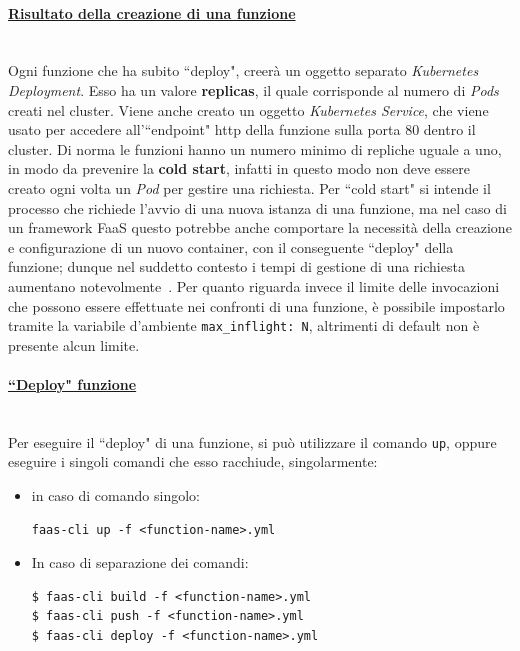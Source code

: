 \documentclass[12pt,a4paper,openany,twoside]{book}
\begin{document}
\paragraph{\underline{Risultato della creazione di una funzione}} ~\\
Ogni funzione che ha subito ``deploy", creerà un oggetto separato \textit{Kubernetes Deployment}. Esso ha un valore \textbf{replicas}, il quale corrisponde al numero di \textit{Pods} creati nel cluster. Viene anche creato un oggetto \textit{Kubernetes Service}, che viene usato per accedere all'``endpoint" \ac{http} della funzione sulla porta 80 dentro il cluster.
Di norma le funzioni hanno un numero minimo di repliche uguale a uno, in modo da prevenire la \textbf{cold start}, infatti in questo modo non deve essere creato ogni volta un \textit{Pod} per gestire una richiesta. Per ``cold start" si intende il processo che richiede l'avvio di una nuova istanza di una funzione, ma nel caso di un framework \ac{FaaS} questo potrebbe anche comportare la necessità della creazione e configurazione di un nuovo container, con il conseguente ``deploy" della funzione; dunque nel suddetto contesto i tempi di gestione di una richiesta aumentano notevolmente~\cite{216063}.
Per quanto riguarda invece il limite delle invocazioni che possono essere effettuate nei confronti di una funzione, è possibile impostarlo tramite la variabile d'ambiente \texttt{max\_inflight: N}, altrimenti di default non è presente alcun limite.

\paragraph{\underline{``Deploy" funzione}} ~\\
Per eseguire il ``deploy" di una funzione, si può utilizzare il comando \texttt{up}, oppure eseguire i singoli comandi che esso racchiude, singolarmente:
\begin{itemize}
    \item in caso di comando singolo: \begin{lstlisting}
faas-cli up -f <function-name>.yml\end{lstlisting}
    \item In caso di separazione dei comandi: \begin{lstlisting}
$ faas-cli build -f <function-name>.yml
$ faas-cli push -f <function-name>.yml
$ faas-cli deploy -f <function-name>.yml\end{lstlisting}
\end{itemize}
\end{document}
